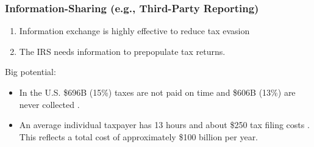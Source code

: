 \documentclass{beamer}
\begin{document}



\begin{frame}
\frametitle{Information-Sharing (e.g., Third-Party Reporting)}
\begin{enumerate}
    \item Information exchange is \alert{highly effective to reduce tax evasion} \parencite{kleven2011unwilling,pomeranz2015no,slemrod2017does}
    \vspace{0.5em}
    \item The IRS needs information to \alert{prepopulate tax returns}.
\end{enumerate}
\vspace{2em}
Big potential: 
\vspace{0.5em}
\begin{itemize}
    \item In the U.S. \$696B (15\%) taxes are not paid on time and \$606B (13\%) are never collected \parencite{IRS_TaxGap_2022_Pub5869}.
    \vspace{0.5em}
    \item An average individual taxpayer has 13 hours and about \$250 tax filing costs \parencite{IRS2022}. This reflects a total cost of approximately \$100 billion per year. 
\end{itemize}
\end{frame}
\end{document}
